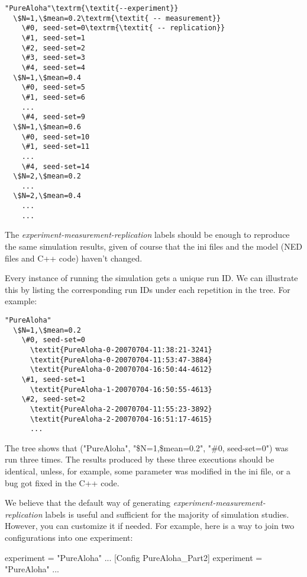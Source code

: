 \begin{Verbatim}[commandchars=\\\{\}]
"PureAloha"\textrm{\textit{--experiment}}
  \$N=1,\$mean=0.2\textrm{\textit{ -- measurement}}
    \#0, seed-set=0\textrm{\textit{ -- replication}}
    \#1, seed-set=1
    \#2, seed-set=2
    \#3, seed-set=3
    \#4, seed-set=4
  \$N=1,\$mean=0.4
    \#0, seed-set=5
    \#1, seed-set=6
    ...
    \#4, seed-set=9
  \$N=1,\$mean=0.6
    \#0, seed-set=10
    \#1, seed-set=11
    ...
    \#4, seed-set=14
  \$N=2,\$mean=0.2
    ...
  \$N=2,\$mean=0.4
    ...
    ...
\end{Verbatim}

The \textit{experiment-measurement-replication} labels should be enough to
reproduce the same simulation results, given of course that the ini
files and the model (NED files and C++ code) haven't changed.

Every instance of running the simulation gets a unique run ID. We can
illustrate this by listing the corresponding run IDs under each
repetition in the tree. For example:

\begin{Verbatim}[commandchars=\\\{\}]
"PureAloha"
  \$N=1,\$mean=0.2
    \#0, seed-set=0
      \textit{PureAloha-0-20070704-11:38:21-3241}
      \textit{PureAloha-0-20070704-11:53:47-3884}
      \textit{PureAloha-0-20070704-16:50:44-4612}
    \#1, seed-set=1
      \textit{PureAloha-1-20070704-16:50:55-4613}
    \#2, seed-set=2
      \textit{PureAloha-2-20070704-11:55:23-3892}
      \textit{PureAloha-2-20070704-16:51:17-4615}
      ...
\end{Verbatim}

The tree shows that ("PureAloha", "\$N=1,\$mean=0.2", "\#0, seed-set=0")
was run three times. The results produced
by these three executions should be identical, unless, for example,
some parameter was modified in the ini file, or a bug got fixed in the
C++ code.

We believe that the default way of generating
\textit{experiment-measurement-replication} labels is useful and
sufficient for the majority of simulation studies. However, you can
customize it if needed. For example, here is a way to join two
configurations into one experiment:

\begin{inifile}
experiment = "PureAloha"
...
[Config PureAloha_Part2]
experiment = "PureAloha"
...
\end{inifile}


